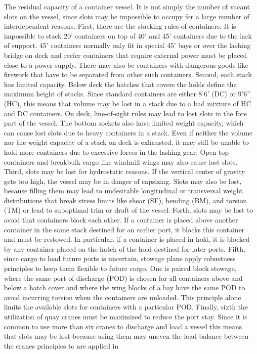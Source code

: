 \documentclass[runningheads]{llncs}
\begin{document}
The residual capacity of a container vessel. It is not simply the number of vacant slots on the vessel, since slots may be impossible to occupy for a large number of interdependent reasons. First, there are the stacking rules of containers. It is impossible to stack 20’ containers on top of 40’ and 45’ containers due to the lack of support. 45’ containers normally only fit in special 45’ bays or over the lashing bridge on deck and reefer containers that require external power must be placed close to a power supply. There may also be containers with dangerous goods like firework that have to be separated from other such containers. Second, each stack has limited capacity. Below deck the hatches that covers the holds define the maximum height of stacks. Since standard containers are either 8’6’ (DC) or 9’6” (HC), this means that volume may be lost in a stack due to a bad mixture of HC and DC containers. On deck, line-of-sight rules may lead to lost slots in the fore part of the vessel. The bottom sockets also have limited weight capacity, which can cause lost slots due to heavy containers in a stack. Even if neither the volume nor the weight capacity of a stack on deck is exhausted, it may still be unable to hold more containers due to excessive forces in the lashing gear. Open top containers and breakbulk cargo like windmill wings may also cause lost slots. Third, slots may be lost for hydrostatic reasons. If the vertical center of gravity gets too high, the vessel may be in danger of capsizing. Slots may also be lost, because filling them may lead to undesirable longitudinal or transversal weight distributions that break stress limits like shear (SF), bending (BM), and torsion (TM) or lead to suboptimal trim or draft of the vessel. Forth, slots may be lost to avoid that containers block each other. If a container is placed above another container in the same stack destined for an earlier port, it blocks this container and must be restowed. In particular, if a container is placed in hold, it is blocked by any container placed on the hatch of the hold destined for later ports. Fifth, since cargo to load future ports is uncertain, stowage plans apply robustness principles to keep them flexible to future cargo. One is paired block stowage, where the same port of discharge (POD) is chosen for all containers above and below a hatch cover and where the wing blocks of a bay have the same POD to avoid incurring torsion when the containers are unloaded. This principle alone limits the available slots for containers with a particular POD. Finally, sixth the utilization of quay cranes must be maximized to reduce the port stay. Since it is common to use more than six cranes to discharge and load a vessel this means that slots may be lost because using them may uneven the load balance between the cranes      principles to are applied in  
\end{document}

